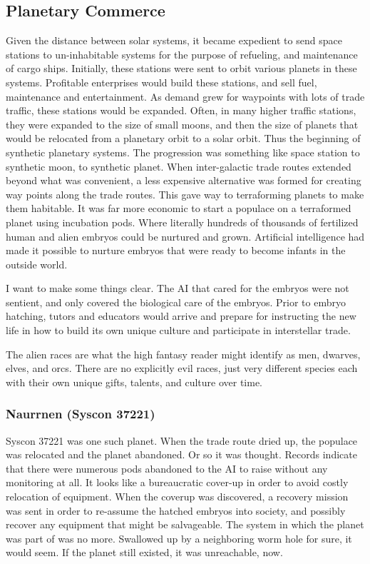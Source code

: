 \documentclass[11pt]{article}
\begin{document}
\subsection{Planetary Commerce}
\label{sec:org3c8ffb5}
Given the distance between solar systems, it became expedient to send space stations to un-inhabitable systems for the purpose of refueling, and maintenance of cargo ships. Initially, these stations were sent to orbit various planets in these systems. Profitable enterprises would build these stations, and sell fuel, maintenance and entertainment. As demand grew for waypoints with lots of trade traffic, these stations would be expanded. Often, in many higher traffic stations, they were expanded to the size of small moons, and then the size of planets that would be relocated from a planetary orbit to a solar orbit. Thus the beginning of synthetic planetary systems. The progression was something like space station to synthetic moon, to synthetic planet. When inter-galactic trade routes extended beyond what was convenient, a less expensive alternative was formed for creating way points along the trade routes. This gave way to terraforming planets to make them habitable. It was far more economic to start a populace on a terraformed planet using incubation pods. Where literally hundreds of thousands of fertilized human and alien embryos could be nurtured and grown. Artificial intelligence had made it possible to nurture embryos that were ready to become infants in the outside world.

I want to make some things clear. The AI that cared for the embryos were not sentient, and only covered the biological care of the embryos. Prior to embryo hatching, tutors and educators would arrive and prepare for instructing the new life in how to build its own unique culture and participate in interstellar trade.

The alien races are what the high fantasy reader might identify as men, dwarves, elves, and orcs. There are no explicitly evil races, just very different species each with their own unique gifts, talents, and culture over time.

\subsubsection{Naurrnen (Syscon 37221)}
\label{sec:org66aca0a}
Syscon 37221 was one such planet. When the trade route dried up, the populace was relocated and the planet abandoned. Or so it was thought. Records indicate that there were numerous pods abandoned to the AI to raise without any monitoring at all. It looks like a bureaucratic cover-up in order to avoid costly relocation of equipment. When the coverup was discovered, a recovery mission was sent in order to re-assume the hatched embryos into society, and possibly recover any equipment that might be salvageable. The system in which the planet was part of was no more. Swallowed up by a neighboring worm hole for sure, it would seem. If the planet still existed, it was unreachable, now.
\end{document}
